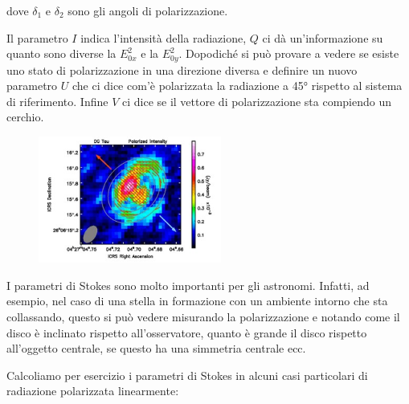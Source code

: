 dove $\delta_1$ e $\delta_2$ sono gli angoli di polarizzazione.

Il parametro $I$ indica l'intensità della radiazione, $Q$ ci dà un'informazione su quanto sono diverse la $E_{0x}^2$ e la $E_{0y}^2$. Dopodiché si può provare a vedere se esiste uno stato di polarizzazione in una direzione diversa e definire un nuovo parametro $U$ che ci dice com'è polarizzata la radiazione a 45° rispetto al sistema di riferimento. Infine $V$ ci dice se il vettore di polarizzazione sta compiendo un cerchio. 

\begin{minipage}{0.395\textwidth}
  \begin{figure}[H]
    \centering
    \includegraphics[width=6cm]{disco}
  \end{figure}
\end{minipage}
\begin{minipage}{0.6\textwidth}
  I parametri di Stokes sono molto importanti per gli astronomi. Infatti, ad esempio, nel caso di una stella in formazione con un ambiente intorno che sta collassando, questo si può vedere misurando la polarizzazione e notando come il disco è inclinato rispetto all'osservatore, quanto è grande il disco rispetto all'oggetto centrale, se questo ha una simmetria centrale ecc. 
\end{minipage}

\vspace{0.1cm}Calcoliamo per esercizio i parametri di Stokes in alcuni casi particolari di radiazione polarizzata linearmente:

